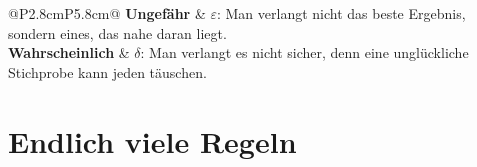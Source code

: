 \begin{merksatz}
\begin{center}
{\small
\renewcommand{\arraystretch}{1.55}
\begin{tabular}{@{}P{2.8cm}P{5.8cm}@{}}
\toprule
\textbf{Ungefähr} & $\varepsilon$: Man verlangt nicht das beste Ergebnis, sondern eines, das nahe daran liegt.\\
\textbf{Wahrscheinlich} & $\delta$: Man verlangt es nicht sicher, denn eine unglückliche Stichprobe kann jeden täuschen.\\
\bottomrule
\end{tabular}}
\end{center}

\begin{center}
\begin{minipage}{0.88\textwidth}
\end{minipage}
\end{center}
\end{merksatz}

\section{Endlich viele Regeln}

